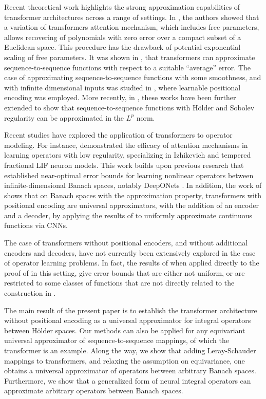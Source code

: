 \documentclass[a4paper,12pt,reqno]{amsart}
\theoremstyle{definition}
\theoremstyle{remark}
\begin{document}
Recent theoretical work highlights the strong approximation capabilities of transformer architectures across a range of settings. In \cite{fang2022attention}, the authors showed that a variation of transformers attention mechanism, which includes free parameters, allows recovering of polynomials with zero error over a compact subset of a Euclidean space. This procedure has the drawback of potential exponential scaling of free parameters. It was shown in \cite{yun2019transformers}, that transformers can approximate sequence-to-sequence functions with respect to a suitable ``average'' error. The case of approximating sequence-to-sequence functions with some smoothness, and with infinite dimensional inputs was studied in \cite{takakura2023approximation}, where learnable positional encoding  was employed. More recently, in \cite{jiao2025approximation}, these works have been further extended to show that sequence-to-sequence functions with H\"older and Sobolev regularity can be approximated in the $L^p$ norm. 


Recent studies have explored the application of transformers to operator modeling. For instance, \cite{shih2025transformers} demonstrated the efficacy of attention mechanisms in learning operators with low regularity, specializing in Izhikevich and tempered fractional LIF neuron models. This work builds upon previous research \cite{lanthaler2022error,deng2022approximation} that established near-optimal error bounds for learning nonlinear operators between infinite-dimensional Banach spaces, notably DeepONets \cite{lu2019deeponet}. In addition, the work of \cite{shih2025transformers} shows that on Banach spaces with the approximation property, transformers with positional encoding are universal approximators, with the addition of an encoder and a decoder, by applying the results of \cite{cordonnier2019relationship} to uniformly approximate continuous functions via CNNs. 

The case of transformers without positional encoders, and without additional encoders and decoders, have not currently been extensively explored in the case of operator learning problems. In fact, the results of \cite{yun2019transformers,takakura2023approximation,jiao2025approximation} when applied directly to the proof of \cite{shih2025transformers} in this setting, give error bounds that are either not uniform, or are restricted to some classes of functions that are not directly related to the construction in \cite{shih2025transformers}.  

The main result of the present paper is to establish the transformer architecture without positional encoding as a universal approximator for integral operators between Hölder spaces.  Our methods can also be applied for any equivariant universal approximator of sequence-to-sequence mappings, of which the transformer is an example. Along the way, we show that adding Leray-Schauder mappings to transformers, and relaxing the assumption on equivariance, one obtains a universal approximator of operators between arbitrary Banach spaces. Furthermore, we show that a generalized form of neural integral operators can approximate arbitrary operators between Banach spaces.
\end{document}
